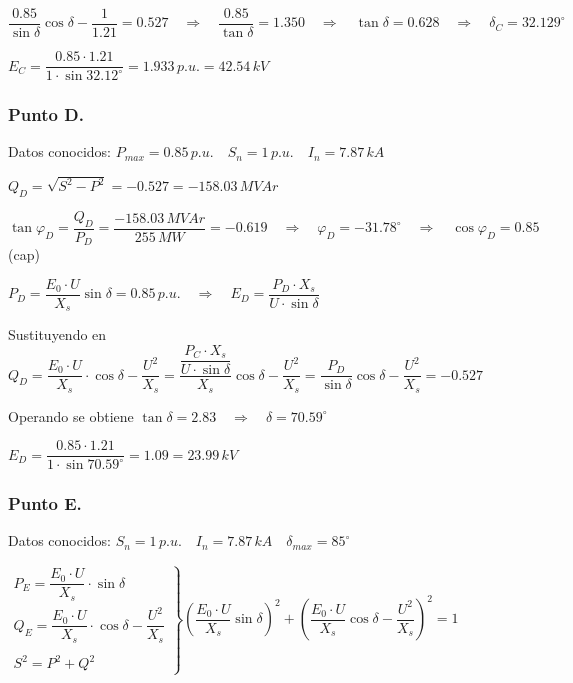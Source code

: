 			\vspace{0.1cm}
			$\dfrac{0.85}{\sin \delta}\cos \delta - \dfrac{1}{1.21} = 0.527 \quad \Rightarrow \quad \dfrac{0.85}{\tan \delta} = 1.350 \quad \Rightarrow \quad \tan \delta = 0.628 \quad \Rightarrow \quad \delta_C = 32.129^\circ$
			
			\vspace{0.1cm}
			$E_C = \dfrac{0.85\cdot 1.21}{1\cdot \sin 32.12^\circ} = 1.933\,p.u. = 42.54\,kV$
			
		\subsubsection*{Punto D.}
			Datos conocidos: $P_{max} = 0.85\,p.u.\quad S_n = 1\,p.u.\quad I_n = 7.87\,kA$
			
			\vspace{0.1cm}
			$Q_D = \sqrt{S^2 - P^2} = -0.527 = -158.03\,MV\!Ar$
			
			\vspace{0.1cm}
			$\tan \varphi_D = \dfrac{Q_D}{P_D} = \dfrac{-158.03\,MV\!Ar}{255\,MW} = -0.619 \quad \Rightarrow \quad \varphi_D = -31.78^\circ \quad \Rightarrow \quad \cos \varphi_D = 0.85$ (cap)
			
			\vspace{0.1cm}
			$P_D = \dfrac{E_0\cdot U}{X_s}\sin \delta = 0.85\,p.u. \quad \Rightarrow \quad E_D = \dfrac{P_D \cdot X_s}{U\cdot \sin \delta}$
			
			\vspace{0.1cm}
			Sustituyendo en $Q_D = \dfrac{E_0\cdot U}{X_s}\cdot \cos \delta - \dfrac{U^2}{X_s} = \dfrac{\dfrac{P_C\cdot X_s}{U\cdot \sin \delta}}{X_s}\cos \delta - \dfrac{U^2}{X_s} = \dfrac{P_D}{\sin \delta}\cos \delta - \dfrac{U^2}{X_s} = -0.527$
			
			\vspace{0.1cm}
			Operando se obtiene $\tan \delta = 2.83 \quad \Rightarrow \quad \delta = 70.59^\circ$
			
			\vspace{0.1cm}
			$E_D = \dfrac{0.85\cdot 1.21}{1\cdot \sin 70.59^\circ} = 1.09 = 23.99\,kV$
		
		\subsubsection*{Punto E.}
			Datos conocidos: $S_n = 1\,p.u.\quad I_n = 7.87\,kA\quad \delta_{max} = 85^\circ$
			
			\vspace{0.1cm}
			$
			\left.
			\begin{matrix}
				P_E = \dfrac{E_0\cdot U}{X_s}\cdot \sin \delta\\
				Q_E = \dfrac{E_0\cdot U}{X_s}\cdot \cos \delta - \dfrac{U^2}{X_s}\\\\
				S^2 = P^2 + Q^2
			\end{matrix}
			\right\}
			\left(\dfrac{E_0\cdot U}{X_s}\sin \delta\right)^2 + \left(\dfrac{E_0\cdot U}{X_s}\cos \delta - \dfrac{U^2}{X_s}\right)^2 = 1
			$
			
